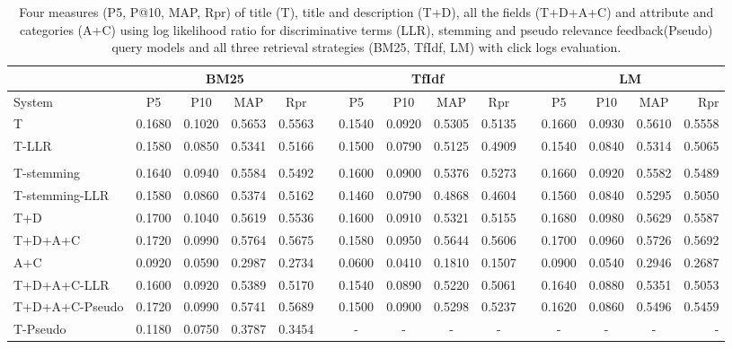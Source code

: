 \begin{table}[H]
\begin{center}
\scriptsize
\caption{
Four measures (P\@5, P@10, MAP, Rpr) of title (T), title and description (T+D), all the fields (T+D+A+C) and attribute and categories (A+C) using log likelihood ratio for discriminative terms (LLR), stemming and pseudo relevance feedback(Pseudo) query models and all three retrieval strategies (BM25, TfIdf, LM)  with click logs evaluation.}
\label{table:qmCl}

\begin{tabular}{lcccccccccccccr}
\toprule
 & \multicolumn{4}{c}{BM25} &    & \multicolumn{4}{c}{TfIdf} &    & \multicolumn{4}{c}{LM} \\
\midrule
System & P\@5 & P\@10 & MAP & Rpr &   & P\@5 & P\@10 & MAP & Rpr &   & P\@5 & P\@10 & MAP & Rpr \\
\midrule
T & 0.1680 & 0.1020 & 0.5653 & 0.5563 &   & 0.1540 & 0.0920 & 0.5305 & 0.5135 &   & 0.1660  & 0.0930 & 0.5610 & 0.5558  \\

T-LLR & 0.1580 & 0.0850 & 0.5341 & 0.5166 &   & 0.1500 & 0.0790 & 0.5125 & 0.4909 &   & 0.1540 & 0.0840 & 0.5314 & 0.5065 \\  \\

T-stemming & 0.1640 & 0.0940 & 0.5584 & 0.5492 &   & 0.1600 & 0.0900 & 0.5376 & 0.5273 &   & 0.1660 & 0.0920 & 0.5582 & 0.5489 \\
T-stemming-LLR & 0.1580 & 0.0860 & 0.5374 & 0.5162 &   & 0.1460 & 0.0790 & 0.4868 & 0.4604 &   & 0.1560 & 0.0840 & 0.5295  & 0.5050 \\

T+D & 0.1700 & 0.1040 & 0.5619 & 0.5536 &   & 0.1600 & 0.0910 & 0.5321 & 0.5155 &   & 0.1680 & 0.0980 & 0.5629 & 0.5587 \\

T+D+A+C & 0.1720 & 0.0990 & 0.5764 & 0.5675 &   & 0.1580 & 0.0950 & 0.5644 & 0.5606 &   & 0.1700 & 0.0960 & 0.5726 & 0.5692 \\

A+C & 0.0920 & 0.0590 & 0.2987 & 0.2734 &   & 0.0600 & 0.0410 & 0.1810 & 0.1507 &   & 0.0900 & 0.0540 & 0.2946 & 0.2687  \\

T+D+A+C-LLR & 0.1600 & 0.0920 & 0.5389 & 0.5170 &   & 0.1540 & 0.0890 & 0.5220 & 0.5061 &   & 0.1640 & 0.0880 & 0.5351 & 0.5053 \\

T+D+A+C-Pseudo & 0.1720 & 0.0990 & 0.5741 & 0.5689 &   & 0.1500 & 0.0900 & 0.5298 & 0.5237 &   & 0.1620 & 0.0860 & 0.5496 & 0.5459 \\

T-Pseudo & 0.1180 & 0.0750 & 0.3787 & 0.3454 &   & - & - & - & - &   & - & - & - & -   \\
\bottomrule
\end{tabular}
\end{center}
\end{table}



